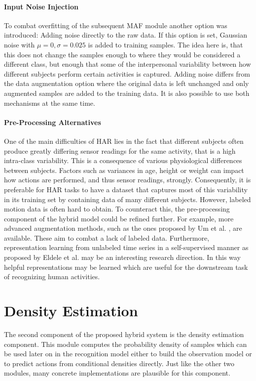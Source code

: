 \documentclass[11pt,titlepage,oneside,openany]{book}
\begin{document}
\paragraph{Input Noise Injection}
To combat overfitting of the subsequent MAF module another option was introduced: Adding noise directly to the raw data. If this option is set, Gaussian noise with $\mu = 0, \sigma = 0.025$ is added to training samples. The idea here is, that this does not change the samples enough to where they would be considered a different class, but enough that some of the interpersonal variability between how different subjects perform certain activities is captured. Adding noise differs from the data augmentation option where the original data is left unchanged and only augmented samples are added to the training data. It is also possible to use both mechanisms at the same time.

\paragraph{Pre-Processing Alternatives}
One of the main difficulties of HAR lies in the fact that different subjects often produce greatly differing sensor readings for the same activity, that is a high intra-class variability. This is a consequence of various physiological differences between subjects. Factors such as variances in age, height or weight can impact how actions are performed, and thus sensor readings, strongly. Consequently, it is preferable for HAR tasks to have a dataset that captures most of this variability in its training set by containing data of many different subjects. However, labeled motion data is often hard to obtain. To counteract this, the pre-processing component of the hybrid model could be refined further. For example, more advanced augmentation methods, such as the ones proposed by Um et al. \cite{um_data_2017}, are available. These aim to combat a lack of labeled data. Furthermore, representation learning from unlabeled time series in a self-supervised manner as proposed by Eldele et al. \cite{eldele_time-series_2021} may be an interesting research direction. In this way helpful representations may be learned which are useful for the downstream task of recognizing human activities.

\section{Density Estimation}
\label{sec:densest}

The second component of the proposed hybrid system is the density estimation component. This module computes the probability density of samples which can be used later on in the recognition model either to build the observation model or to predict actions from conditional densities directly. Just like the other two modules, many concrete implementations are plausible for this component.
\end{document}
